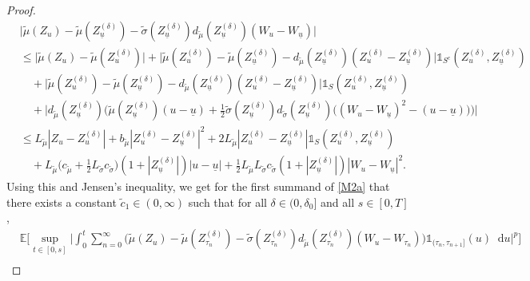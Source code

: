 \documentclass[11pt,a4paper]{article}
\numberwithin{equation}{section}
\theoremstyle{definition}
\newcommand{\E}{{\mathbb{E}}}
\newcommand{\diff}{\mathop{}\!\mathrm{d}}
\begin{document}
\begin{proof}
\begin{equation}
\begin{aligned}
    &\big|\widetilde\mu(Z_u) - \widetilde\mu(Z^{(\delta)}_{\underline u}) - \widetilde\sigma(Z^{(\delta)}_{\underline u}) d_{\widetilde\mu}(Z^{(\delta)}_{\underline u})(W_u-W_{\underline u})\big|\\
    &\leq \big|\widetilde\mu ( Z_{u}) - \widetilde\mu (Z^{(\delta)}_{u})\big|
    + \big|\widetilde\mu (Z^{(\delta)}_{u}) - \widetilde\mu (Z^{(\delta)}_{\underline u}) -d_{\widetilde\mu} (Z^{(\delta)}_{\underline u})(Z^{(\delta)}_{u} - Z^{(\delta)}_{\underline u})\big|\mathds{1}_{S^c}(Z^{(\delta)}_{u},Z^{(\delta)}_{\underline u}) \\
    &\quad + \big|\widetilde\mu (Z^{(\delta)}_{u}) - \widetilde\mu (Z^{(\delta)}_{\underline u}) -d_{\widetilde\mu} (Z^{(\delta)}_{\underline u})(Z^{(\delta)}_{u} - Z^{(\delta)}_{\underline u})\big|\mathds{1}_{S}(Z^{(\delta)}_{u},Z^{(\delta)}_{\underline u})\\
    &\quad + \Big|d_{\widetilde\mu} (Z^{(\delta)}_{\underline u})\Big( \widetilde\mu(Z^{(\delta)}_{\underline u})(u-\underline u) +\frac{1}{2} \widetilde\sigma (Z^{(\delta)}_{\underline u})d_{\widetilde\sigma} (Z^{(\delta)}_{\underline u})\big((W_u-W_{\underline u})^2-(u-\underline u)\big)\Big)\Big|\\
    &\leq L_{\widetilde\mu} |Z_{u} - Z^{(\delta)}_{u}|
    + b_{\widetilde\mu } |Z^{(\delta)}_{u} - Z^{(\delta)}_{\underline u} |^2
    + 2L_{\widetilde\mu} |Z^{(\delta)}_{u} - Z^{(\delta)}_{\underline u}|\mathds{1}_{S}(Z^{(\delta)}_{u},Z^{(\delta)}_{\underline u})\\
    &\quad + L_{\widetilde\mu} \Big(c_{\widetilde\mu} + \frac{1}{2}L_{\widetilde\sigma} c_{\widetilde\sigma}\Big)(1+|Z^{(\delta)}_{\underline u}|) |u-\underline u| +\frac{1}{2}L_{\widetilde\mu}L_{\widetilde\sigma} c_{\widetilde\sigma}(1+|Z^{(\delta)}_{\underline u}|) |W_u-W_{\underline u}|^2.
    \end{aligned}
\end{equation}
Using this and Jensen's inequality, we get for the first summand of \eqref{M2a} that there exists a constant $\widetilde c_1\in(0,\infty)$ such that for all $\delta\in(0,\delta_0]$ and all $s\in[0,T]$,
\begin{equation}\label{M4}
    \begin{aligned}
    &\E\Big[\sup_{t\in[0,s]} \Big|  \int_0^t \sum_{n=0}^{\infty} \big(\widetilde\mu(Z_u) - \widetilde\mu(Z^{(\delta)}_{\tau_n}) - \widetilde\sigma(Z^{(\delta)}_{\tau_n}) d_{\widetilde\mu}(Z^{(\delta)}_{\tau_n})(W_u-W_{\tau_n})\big) \mathds{1}_{(\tau_n,\tau_{n+1}]}(u) \diff u\Big|^p\Big] \\ 

\end{aligned}
\end{equation}
\end{proof}
\end{document}
